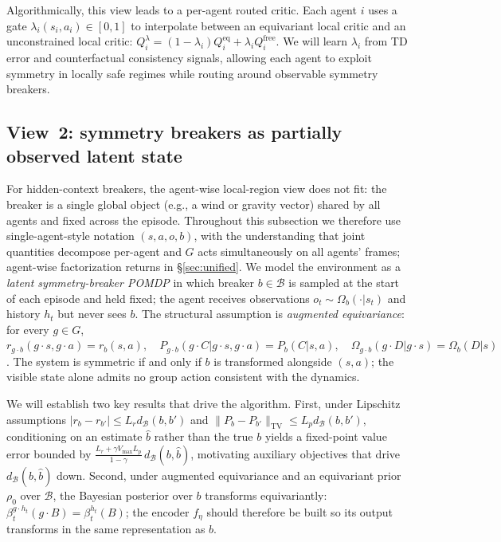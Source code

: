 \documentclass[11pt]{article}
\begin{document}
Algorithmically, this view leads to a per-agent routed critic. Each agent \(i\) uses a gate
\(\lambda_i(s_i,a_i)\in[0,1]\) to interpolate between an equivariant local critic and an unconstrained local critic:
\(Q_i^{\lambda}=(1-\lambda_i)Q_i^{\mathrm{eq}}+\lambda_i Q_i^{\mathrm{free}}\).
We will learn \(\lambda_i\) from TD error and counterfactual consistency signals, allowing each agent to exploit symmetry in locally safe regimes while routing around observable symmetry breakers.

\subsection{View~2: symmetry breakers as partially observed latent state}
For hidden-context breakers, the agent-wise local-region view does not fit: the breaker is a single global object (e.g., a wind or gravity vector) shared by all agents and fixed across the episode. Throughout this subsection we therefore use single-agent-style notation $(s, a, o, b)$, with the understanding that joint quantities decompose per-agent and $G$ acts simultaneously on all agents' frames; agent-wise factorization returns in \S\ref{sec:unified}. We model the environment as a \emph{latent symmetry-breaker POMDP} in which breaker $b \in \mathcal{B}$ is sampled at the start of each episode and held fixed; the agent receives observations $o_t \sim \Omega_b(\cdot | s_t)$ and history $h_t$ but never sees $b$.
The structural assumption is \emph{augmented equivariance}: for every $g \in G$,
$
r_{g\cdot b}(g \cdot s, g \cdot a) = r_b(s,a), \quad
P_{g\cdot b}(g \cdot C | g \cdot s, g \cdot a) = P_b(C | s,a), \quad
\Omega_{g\cdot b}(g \cdot D | g \cdot s) = \Omega_b(D | s)
$.
The system is symmetric if and only if $b$ is transformed alongside $(s,a)$; the visible state alone admits no group action consistent with the dynamics.

We will establish two key results that drive the algorithm. 
First, under Lipschitz assumptions $|r_b - r_{b'}| \le L_r d_\mathcal{B}(b, b')$ and $\|P_b - P_{b'}\|_{\text{TV}} \le L_p d_\mathcal{B}(b, b')$, conditioning on an estimate $\widehat{b}$ rather than the true $b$ yields a fixed-point value error bounded by $\tfrac{L_r + \gamma V_{\max} L_p}{1-\gamma}\,d_\mathcal{B}(b, \widehat{b})$, motivating auxiliary objectives that drive $d_\mathcal{B}(b, \widehat{b})$ down. 
Second, under augmented equivariance and an equivariant prior $\rho_0$ over $\mathcal{B}$, the Bayesian posterior over $b$ transforms equivariantly: $\beta^{g \cdot h_t}_t(g \cdot B) = \beta^{h_t}_t(B)$; the encoder $f_\eta$ should therefore be built so its output transforms in the same representation as $b$.
\end{document}
